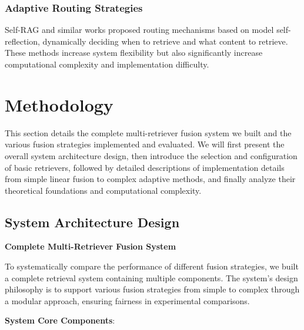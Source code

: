 \documentclass[letterpaper]{article} %
\begin{document}
\subsubsection{Adaptive Routing Strategies}

Self-RAG \cite{jeong2024adaptive} and similar works proposed routing mechanisms based on model self-reflection, dynamically deciding when to retrieve and what content to retrieve. These methods increase system flexibility but also significantly increase computational complexity and implementation difficulty.

\section{Methodology}

This section details the complete multi-retriever fusion system we built and the various fusion strategies implemented and evaluated. We will first present the overall system architecture design, then introduce the selection and configuration of basic retrievers, followed by detailed descriptions of implementation details from simple linear fusion to complex adaptive methods, and finally analyze their theoretical foundations and computational complexity.

\subsection{System Architecture Design}

\textbf{Complete Multi-Retriever Fusion System}

To systematically compare the performance of different fusion strategies, we built a complete retrieval system containing multiple components. The system's design philosophy is to support various fusion strategies from simple to complex through a modular approach, ensuring fairness in experimental comparisons.

\textbf{System Core Components}:
\end{document}
